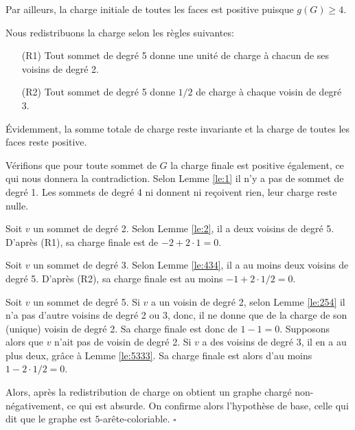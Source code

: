 \documentclass[10pt,a4paper]{article}
\newcommand{\ep}{{\hfill $\square$}}
\begin{document}
Par ailleurs, la charge initiale de toutes les faces est positive puisque $g(G)\ge 4$.

Nous redistribuons la charge selon les règles suivantes:
\begin{enumerate}
\item[(R1)] Tout sommet de degré 5 donne une unité de charge à chacun de ses voisins de degré 2.
\item[(R2)] Tout sommet de degré 5 donne $1/2$ de charge à chaque voisin de degré 3.
\end{enumerate}

Évidemment, la somme totale de charge reste invariante et la charge de toutes les faces reste positive.

Vérifions que pour toute sommet de $G$ la charge finale est positive également, ce qui nous donnera la contradiction.
Selon Lemme \ref{le:1} il n'y a pas de sommet de degré 1.
Les sommets de degré 4 ni donnent ni reçoivent rien, leur charge reste nulle.

Soit $v$ un sommet de degré 2. Selon Lemme \ref{le:2}, il a deux voisins de degré 5. D'après (R1), sa charge finale est de $-2 + 2\cdot 1=0$.

Soit $v$ un sommet de degré 3. Selon Lemme \ref{le:434}, il a au moins deux voisins de degré 5. D'après (R2), sa charge finale est au moins $-1 + 2\cdot 1/2 = 0$.

Soit $v$ un sommet de degré 5. Si $v$ a un voisin de degré 2, selon Lemme \ref{le:254} il n'a pas d'autre voisins de degré 2 ou 3, donc, il ne donne que de la charge de son (unique) voisin de degré 2. Sa charge finale est donc de $1-1=0$.
Supposons alors que $v$ n'ait pas de voisin de degré 2. Si $v$ a des voisins de degré 3, il en a au plus deux, grâce à Lemme \ref{le:5333}. Sa charge finale est alors d'au moins $1-2\cdot 1/2 = 0$. 

Alors, après la redistribution de charge on obtient un graphe chargé non-négativement, ce qui est absurde. On confirme alors l'hypothèse de base, celle qui dit que le graphe est $5$-arête-coloriable.
\ep


\end{document}
